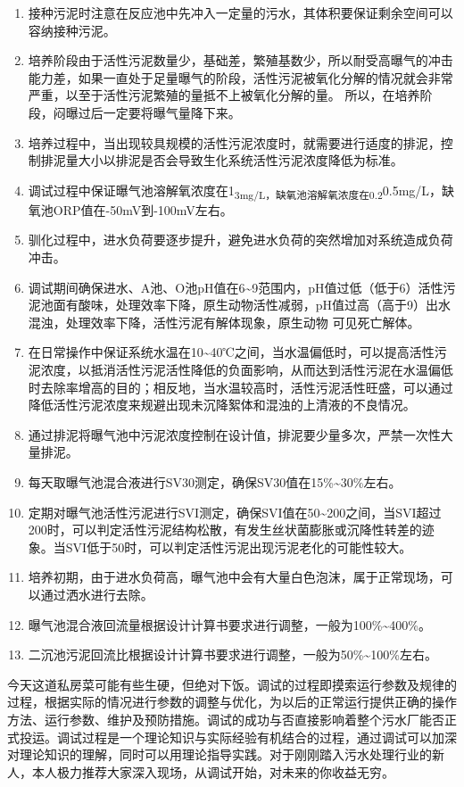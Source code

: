 \documentclass[
]{book}
\begin{document}
\begin{enumerate}
\def\labelenumi{(\arabic{enumi})}
\item
  接种污泥时注意在反应池中先冲入一定量的污水，其体积要保证剩余空间可以容纳接种污泥。
\item
  培养阶段由于活性污泥数量少，基础差，繁殖基数少，所以耐受高曝气的冲击能力差，如果一直处于足量曝气的阶段，活性污泥被氧化分解的情况就会非常严重，以至于活性污泥繁殖的量抵不上被氧化分解的量。 所以，在培养阶段，闷曝过后一定要将曝气量降下来。
\item
  培养过程中，当出现较具规模的活性污泥浓度时，就需要进行适度的排泥，控制排泥量大小以排泥是否会导致生化系统活性污泥浓度降低为标准。
\item
  调试过程中保证曝气池溶解氧浓度在1\textsubscript{3mg/L，缺氧池溶解氧浓度在0.2}0.5mg/L，缺氧池ORP值在-50mV到-100mV左右。
\item
  驯化过程中，进水负荷要逐步提升，避免进水负荷的突然增加对系统造成负荷冲击。
\item
  调试期间确保进水、A池、O池pH值在6\textasciitilde9范围内，pH值过低（低于6）活性污泥池面有酸味，处理效率下降，原生动物活性减弱，pH值过高（高于9）出水混浊，处理效率下降，活性污泥有解体现象，原生动物 可见死亡解体。
\item
  在日常操作中保证系统水温在10\textasciitilde40℃之间，当水温偏低时，可以提高活性污泥浓度，以抵消活性污泥活性降低的负面影响，从而达到活性污泥在水温偏低时去除率增高的目的；相反地，当水温较高时，活性污泥活性旺盛，可以通过降低活性污泥浓度来规避出现未沉降絮体和混浊的上清液的不良情况。
\item
  通过排泥将曝气池中污泥浓度控制在设计值，排泥要少量多次，严禁一次性大量排泥。
\item
  每天取曝气池混合液进行SV30测定，确保SV30值在15\%\textasciitilde30\%左右。
\item
  定期对曝气池活性污泥进行SVI测定，确保SVI值在50\textasciitilde200之间，当SVI超过200时，可以判定活性污泥结构松散，有发生丝状菌膨胀或沉降性转差的迹象。当SVI低于50时，可以判定活性污泥出现污泥老化的可能性较大。
\item
  培养初期，由于进水负荷高，曝气池中会有大量白色泡沫，属于正常现场，可以通过洒水进行去除。
\item
  曝气池混合液回流量根据设计计算书要求进行调整，一般为100\%\textasciitilde400\%。
\item
  二沉池污泥回流比根据设计计算书要求进行调整，一般为50\%\textasciitilde100\%左右。
\end{enumerate}

今天这道私房菜可能有些生硬，但绝对下饭。调试的过程即摸索运行参数及规律的过程，根据实际的情况进行参数的调整与优化，为以后的正常运行提供正确的操作方法、运行参数、维护及预防措施。调试的成功与否直接影响着整个污水厂能否正式投运。调试过程是一个理论知识与实际经验有机结合的过程，通过调试可以加深对理论知识的理解，同时可以用理论指导实践。对于刚刚踏入污水处理行业的新人，本人极力推荐大家深入现场，从调试开始，对未来的你收益无穷。
\end{document}
